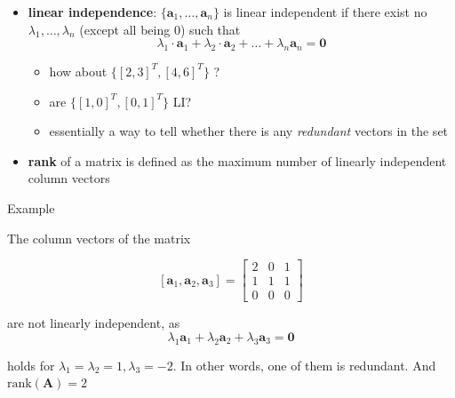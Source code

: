 \documentclass[ignorenonframetext,]{beamer}
\providecommand{\tightlist}{%
  \setlength{\itemsep}{0pt}\setlength{\parskip}{0pt}}
\newcommand{\vv}[1]{\boldsymbol{#1}}
\begin{document}
\begin{frame}{}
\protect\hypertarget{section-2}{}

\begin{itemize}
\item
  \textbf{linear independence}: \(\{\vv{a}_1, \ldots, \vv{a}_n\}\) is
  linear independent if there exist no \(\lambda_1, \ldots, \lambda_n\)
  (except all being 0) such that
  \[\lambda_1\cdot \vv{a}_1 + \lambda_2 \cdot \vv{a}_2+\ldots + \lambda_n\vv{a}_n=\vv{0}\]

  \begin{itemize}
  \tightlist
  \item
    how about \(\{[2,3]^T, [4,6]^T\}\) ?
  \item
    are \(\{[1,0]^T, [0,1]^T\}\) LI?
  \item
    essentially a way to tell whether there is any \emph{redundant}
    vectors in the set
  \end{itemize}
\item
  \textbf{rank} of a matrix is defined as the maximum number of linearly
  independent column vectors
\end{itemize}

\end{frame}

\begin{frame}{Example}
\protect\hypertarget{example-2}{}

The column vectors of the matrix

\[[\vv{a}_1, \vv{a}_2, \vv{a}_3]= \begin{bmatrix} 2 &0 & 1 \\
1&1& 1 \\
0 &0&0
\end{bmatrix}\]

are not linearly independent, as
\[\lambda_1 \vv{a}_1 +\lambda_2\vv{a}_2+\lambda_3\vv{a}_3 = \vv{0}\]

holds for \(\lambda_1=\lambda_2=1, \lambda_3=-2\). In other words, one
of them is redundant. And \(\text{rank}(\vv{A}) = 2\)

\end{frame}
\end{document}
